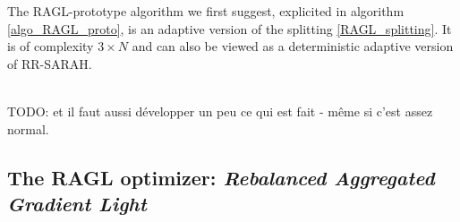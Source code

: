 The RAGL-prototype algorithm we first suggest, explicited in algorithm \ref{algo_RAGL_proto}, is an adaptive version of the splitting \eqref{RAGL_splitting}. 
It is of complexity $3\times N$ and can also be viewed as a deterministic adaptive version of RR-SARAH. 

\\
TODO: et il faut aussi développer un peu ce qui est fait - même si c'est assez normal.


\subsection{The RAGL optimizer: {\it Rebalanced Aggregated Gradient Light}}
\label{RAGL}

